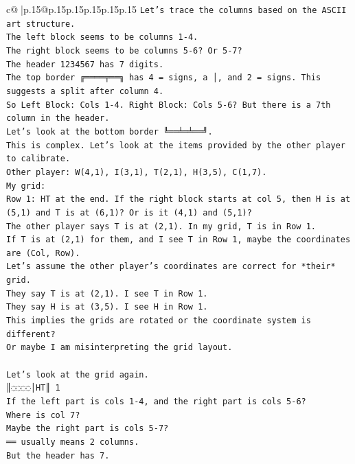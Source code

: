 \documentclass{article}
\begin{document}
{\begin{supertabular}{c@{$\;$}|p{.15\linewidth}@{}p{.15\linewidth}p{.15\linewidth}p{.15\linewidth}p{.15\linewidth}p{.15\linewidth}}
{{{\texttt{Let's trace the columns based on the ASCII art structure.} \\
\texttt{The left block seems to be columns 1{-}4.} \\
\texttt{The right block seems to be columns 5{-}6? Or 5{-}7?} \\
\texttt{The header 1234567 has 7 digits.} \\
\texttt{The top border ╔════╤══╗ has 4 = signs, a │, and 2 = signs. This suggests a split after column 4.} \\
\texttt{So Left Block: Cols 1{-}4. Right Block: Cols 5{-}6? But there is a 7th column in the header.} \\
\texttt{Let's look at the bottom border ╚══╧═╧══╝.} \\
\texttt{This is complex. Let's look at the items provided by the other player to calibrate.} \\
\texttt{Other player: W(4,1), I(3,1), T(2,1), H(3,5), C(1,7).} \\
\texttt{My grid:} \\
\texttt{Row 1: HT at the end. If the right block starts at col 5, then H is at (5,1) and T is at (6,1)? Or is it (4,1) and (5,1)?} \\
\texttt{The other player says T is at (2,1). In my grid, T is in Row 1.} \\
\texttt{If T is at (2,1) for them, and I see T in Row 1, maybe the coordinates are (Col, Row).} \\
\texttt{Let's assume the other player's coordinates are correct for *their* grid.} \\
\texttt{They say T is at (2,1). I see T in Row 1.} \\
\texttt{They say H is at (3,5). I see H in Row 1.} \\
\texttt{This implies the grids are rotated or the coordinate system is different?} \\
\texttt{Or maybe I am misinterpreting the grid layout.} \\
\\ 
\texttt{Let's look at the grid again.} \\
\texttt{║◌◌◌◌│HT║ 1} \\
\texttt{If the left part is cols 1{-}4, and the right part is cols 5{-}6?} \\
\texttt{Where is col 7?} \\
\texttt{Maybe the right part is cols 5{-}7?} \\
\texttt{══ usually means 2 columns.} \\
\texttt{But the header has 7.} \\
}}}
\end{supertabular}}
\end{document}
